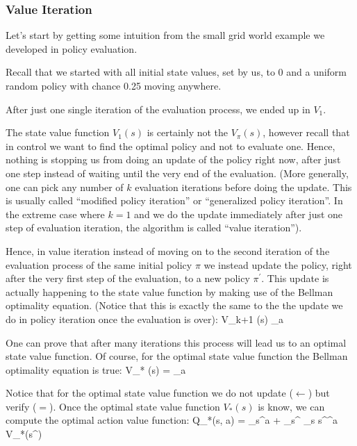 \subsubsection{Value Iteration}

Let's start by getting some intuition from the small grid world example we developed in policy evaluation.

\be
Recall that we started with all initial state values, set by us, to 0 and a uniform random policy with chance 0.25
moving anywhere.


After just one single iteration of the evaluation process, we ended up in $V_1 $.


The state value function $V_1(s)$ is certainly not the $V_{\pi}(s)$, however recall that in control we want to find
the optimal policy and not to evaluate one. Hence, nothing is stopping us from doing an update of the policy right
now, after just one step instead of waiting until the very end of the evaluation. (More generally, one can pick any
number of $k$ evaluation iterations before doing the update. This is usually called ``modified policy iteration'' or
``generalized policy iteration''. In the extreme case where $k=1$ and we do the update immediately after just one step
of evaluation iteration, the algorithm is called ``value iteration'').
\ee

Hence, in value iteration instead of moving on to the second iteration of the evaluation process of the same initial
policy $\pi$ we instead update the policy, right after the very first step of the evaluation, to a new policy
$\pi^\prime$. This update is actually happening to the state value function by making use of the Bellman optimality
equation. (Notice that this is exactly the same to the the update we do in policy iteration once the evaluation is
over):
\bse
V_{k+1} (s) \gets \max_{a} 
\ese

One can prove that after many iterations this process will lead us to an optimal state value function. Of course, for
the optimal state value function the Bellman optimality equation is true:
\bse
V_{*} (s) = \max_{a} 
\ese

Notice that for the optimal state value function we do not update ($\gets$) but verify ($=$). Once the optimal state
value function $V_*(s)$ is know, we can compute the optimal action value function:
\bse
Q_{*}(s, a) = _{s}^{a} + \gamma \sum_{s^{\prime}} _{s s^\prime}^{a} V_{*}(s^\prime)
\ese

